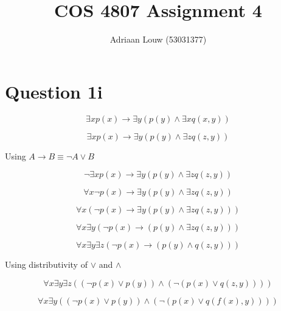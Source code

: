 \documentclass[10pt,a4paper]{article}
\title{COS 4807 Assignment 4}
\author{Adriaan Louw (53031377)}
\begin{document}
\maketitle


\section{Question 1i}

\begin{equation}
 \exists x p(x)\rightarrow \exists y(p(y)\wedge\exists x q(x,y))
\end{equation}

\begin{equation}
 \exists x p(x)\rightarrow \exists y(p(y)\wedge\exists z q(z,y))
\end{equation}

Using $A\rightarrow B \equiv \neg A \vee B$

\begin{equation}
 \neg\exists x p(x)\rightarrow \exists y(p(y)\wedge\exists z q(z,y))
\end{equation}

\begin{equation}
 \forall x \neg p(x)\rightarrow \exists y(p(y)\wedge\exists z q(z,y))
\end{equation}

\begin{equation}
 \forall x (\neg p(x)\rightarrow \exists y(p(y)\wedge\exists z q(z,y)))
\end{equation}

\begin{equation}
 \forall x\exists y (\neg p(x)\rightarrow (p(y)\wedge\exists z q(z,y)))
\end{equation}

\begin{equation}
 \forall x\exists y \exists z (\neg p(x)\rightarrow (p(y)\wedge q(z,y)))
\end{equation}

Using distributivity of $\vee$ and $\wedge$

\begin{equation}
 \forall x\exists y \exists z ((\neg p(x) \vee p(y))\wedge(\neg (p(x) \vee q(z,y))))
\end{equation}

\begin{equation}
 \forall x\exists y ((\neg p(x) \vee p(y))\wedge(\neg (p(x) \vee q(f(x),y))))
\end{equation}
\end{document}

